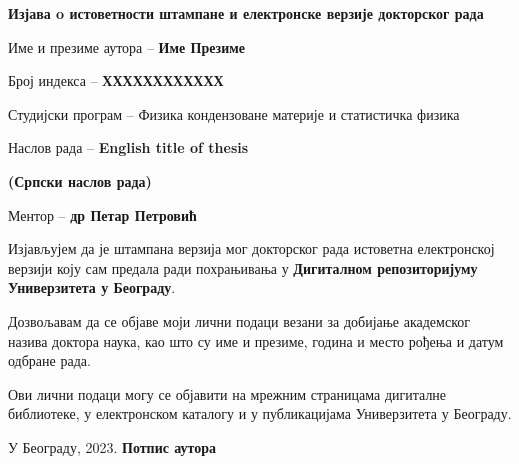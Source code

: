 \cleardoublepage

\thispagestyle{empty}
\setlength{\parindent}{0pt}
\renewcommand{\headrulewidth}{0pt}


\normalsize

\mbox{}
\vspace{1cm}

\begin{center}


\begin{Large}\textbf{Изјава o истоветности штампане и електронске верзије 
докторског рада 
}
\end{Large} 
\end{center}


\vspace{1cm}

Име и презиме аутора -- \textbf{Име Презиме}

Број индекса -- \textbf{ХХХХХХХХХХХХ}

Студијски програм --  Физика кондензоване материје и статистичка физика

Наслов рада -- 
{
\textbf{English title of thesis}}

\textbf{(Српски наслов рада)}

Ментор -- \textbf{др Петар Петровић}

Изјављујем  да  је  штампана  верзија  мог  докторског  рада  истоветна  
електронској верзији  коју  сам  предала  ради  похрањивања у \textbf{Дигиталном 
репозиторијуму Универзитета у Београду}. 

Дозвољавам да се објаве моји лични 
подаци везани за добијање академског назива доктора наука, као што су име и 
презиме, година и место рођења и датум одбране рада. 

Ови лични подаци могу се 
објавити на мрежним страницама дигиталне библиотеке, у електронском каталогу и 
у 
публикацијама Универзитета у Београду.
 

\vfill

У Београду, \hspace{1cm} 2023.  \hfill  \textbf{Потпис
аутора\hspace{2cm}\mbox{}}

\vspace{.5cm}
\hspace{10cm}\hrulefill 


\hspace{\fill}
\let\cleardoublepage\clearpage


